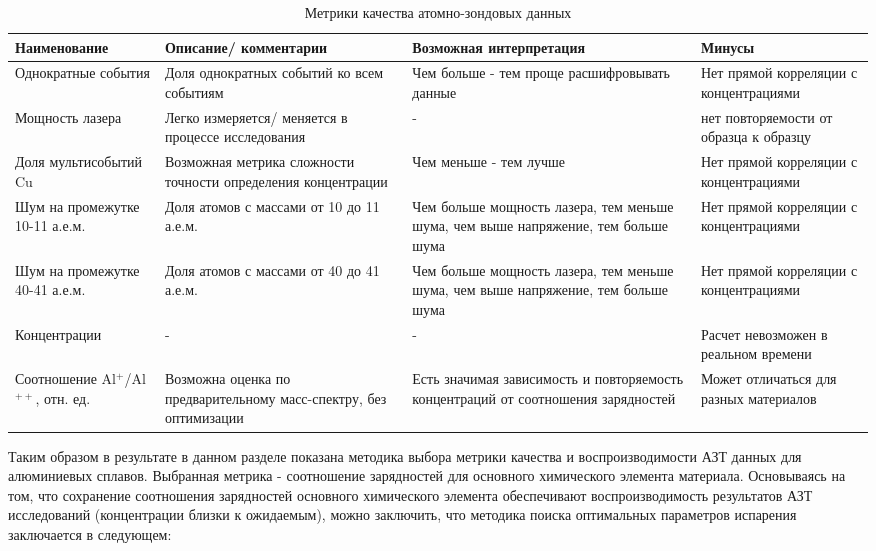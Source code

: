 \begin{table} [htb]
	\centering
	\caption{Метрики качества атомно-зондовых данных}
	\label{tab:params_expl}
	\begin{SingleSpace}
		\begin{tabularx}{\textwidth} {| X | X | X | X |}
			\hline
			Наименование & Описание/ комментарии & Возможная интерпретация & Минусы  \\ \hline
			Однократные события & {Доля однократных событий ко всем событиям}  & {Чем больше - тем проще расшифровывать данные}  & {Нет прямой корреляции с концентрациями}              \\ \hline
			Мощность лазера & {Легко измеряется/ меняется в процессе исследования}  & {-}  & {нет повторяемости от образца к образцу}              \\ \hline
			Доля мультисобытий Cu & Возможная метрика сложности точности определения концентрации & Чем меньше - тем лучше & Нет прямой корреляции с концентрациями          \\ \hline		
			Шум на промежутке 10-11 а.е.м.      & Доля атомов с массами от 10 до 11 а.е.м. & Чем больше мощность лазера, тем меньше шума, чем выше напряжение, тем больше шума  & Нет прямой корреляции с концентрациями               \\ \hline
			Шум на промежутке 40-41 а.е.м.      & Доля атомов с массами от 40 до 41 а.е.м. & Чем больше мощность лазера, тем меньше шума, чем выше напряжение, тем больше шума  & Нет прямой корреляции с концентрациями             \\ \hline
			Концентрации  & -   &  -   & Расчет невозможен в реальном времени  \\ \hline			
			Соотношение Al$^+$/Al$^{++}$, отн. ед.    & Возможна оценка по предварительному масс-спектру, без оптимизации   & Есть значимая зависимость и повторяемость концентраций от соотношения зарядностей  & Может отличаться для разных материалов   \\ \hline
		\end{tabularx}
	\end{SingleSpace}
\end{table}

\FloatBarrier
Таким образом в результате в данном разделе показана методика выбора метрики качества и воспроизводимости АЗТ данных для алюминиевых сплавов. Выбранная метрика - соотношение зарядностей для основного химического элемента материала. Основываясь на том, что сохранение соотношения зарядностей основного химического элемента обеспечивают воспроизводимость результатов АЗТ исследований (концентрации близки к ожидаемым), можно заключить, что методика поиска оптимальных параметров испарения заключается в следующем:

